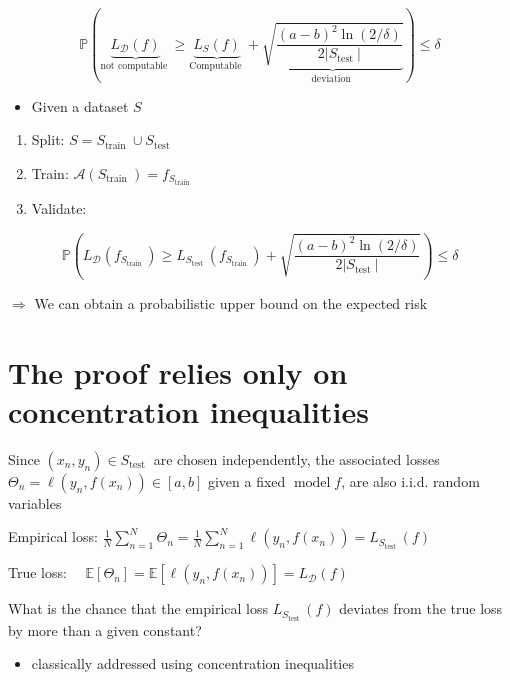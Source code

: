 \documentclass[10pt]{article}
\begin{document}
$$
\mathbb{P}(\underbrace{L_{\mathscr{D}}(f)}_{\text {not computable }} \geq \underbrace{L_{S}(f)}_{\text {Computable }}+\underbrace{\sqrt{\frac{(a-b)^{2} \ln (2 / \delta)}{2\left|S_{\text {test }}\right|}}}_{\text {deviation }}) \leq \delta
$$

\begin{itemize}
  \item Given a dataset $S$
\end{itemize}

\begin{enumerate}
  \item Split: $S=S_{\text {train }} \cup S_{\text {test }}$

  \item Train: $\mathscr{A}\left(S_{\text {train }}\right)=f_{S_{\text {train }}}$

  \item Validate:

\end{enumerate}

$$
\mathbb{P}\left(L_{\mathscr{D}}\left(f_{S_{\text {train }}}\right) \geq L_{S_{\text {test }}}\left(f_{S_{\text {train }}}\right)+\sqrt{\frac{(a-b)^{2} \ln (2 / \delta)}{2\left|S_{\text {test }}\right|}}\right) \leq \delta
$$

$\Rightarrow$ We can obtain a probabilistic upper bound on the expected risk

\section*{The proof relies only on concentration inequalities}
Since $\left(x_{n}, y_{n}\right) \in S_{\text {test }}$ are chosen independently, the associated losses $\Theta_{n}=\ell\left(y_{n}, f\left(x_{n}\right)\right) \in[a, b]$ given a fixed $\operatorname{model} f$, are also i.i.d. random variables

Empirical loss: $\frac{1}{N} \sum_{n=1}^{N} \Theta_{n}=\frac{1}{N} \sum_{n=1}^{N} \ell\left(y_{n}, f\left(x_{n}\right)\right)=L_{S_{\text {test }}}(f)$

True loss: $\quad \mathbb{E}\left[\Theta_{n}\right]=\mathbb{E}\left[\ell\left(y_{n}, f\left(x_{n}\right)\right)\right]=L_{\mathscr{D}}(f)$

What is the chance that the empirical loss $L_{S_{\text {test }}}(f)$ deviates from the true loss by more than a given constant?

\begin{itemize}
  \item classically addressed using concentration inequalities
\end{itemize}
\end{document}
